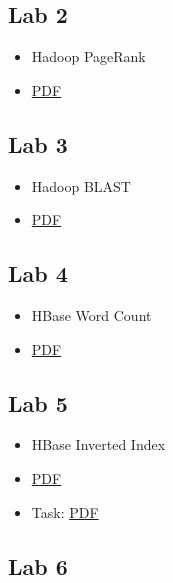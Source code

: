 \subsection{Lab 2}\label{lab-2}

\begin{itemize}
\tightlist
\item
  Hadoop PageRank
\item
  \href{https://drive.google.com/open?id=0B88HKpainTSfTWhTaEs0R05RRkE}{PDF}
\end{itemize}

\subsection{Lab 3}\label{lab-3}

\begin{itemize}
\tightlist
\item
  Hadoop BLAST
\item
  \href{https://drive.google.com/open?id=0B88HKpainTSfdUhVOWRyNnZBT0E}{PDF}
\end{itemize}

\subsection{Lab 4}\label{lab-4}

\begin{itemize}
\tightlist
\item
  HBase Word Count
\item
  \href{https://drive.google.com/open?id=0B88HKpainTSfZEE5N2JnN2ZMZGc}{PDF}
\end{itemize}

\subsection{Lab 5}\label{lab-5}

\begin{itemize}
\tightlist
\item
  HBase Inverted Index
\item
  \href{https://drive.google.com/open?id=0B88HKpainTSfM010TVZuTlJnSVE}{PDF}
\item
  Task:
  \href{https://drive.google.com/open?id=0B88HKpainTSfWjEySFdhcjFpZU0}{PDF}
\end{itemize}

\subsection{Lab 6}\label{lab-6}


